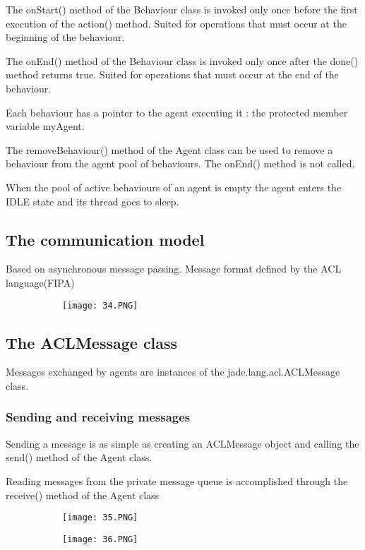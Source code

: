\documentclass{article}
\begin{document}
The onStart() method of the Behaviour class is invoked only once before the first execution of the action() method. Suited for operations that must occur at the beginning of the behaviour.

The onEnd() method of the Behaviour class is invoked only once after the done() method returns true. Suited for operations that must occur at the end of the behaviour.

Each behaviour has a pointer to the agent executing it : the protected member variable myAgent.

The removeBehaviour() method of the Agent class can be used to remove a behaviour from the agent pool of behaviours. The onEnd() method is not called.

When the pool of active behaviours of an agent is empty the agent enters the IDLE state and its thread goes to sleep.

\subsection{The communication model}

Based on asynchronous message passing. Message format defined by the ACL language(FIPA)

\begin{figure}[ht!]
  \centering
  \begin{subfigure}[b]{0.5\linewidth}
    \texttt{[image: 34.PNG]}
  \end{subfigure}
  \end{figure}

\subsection{The ACLMessage class}

Messages exchanged by agents are instances of the jade.lang.acl.ACLMessage class.

\subsubsection{Sending and receiving messages}

Sending a message is as simple as creating an ACLMessage object and calling the send() method of the Agent class. 

Reading messages from the private message queue is accomplished through the receive() method of the Agent class

\begin{figure}[ht!]
  \centering
  \begin{subfigure}[b]{0.5\linewidth}
    \texttt{[image: 35.PNG]}
  \end{subfigure}
     \begin{subfigure}[b]{0.49\textwidth}
         \centering
         \texttt{[image: 36.PNG]}
     \end{subfigure}
\end{figure}
\end{document}
